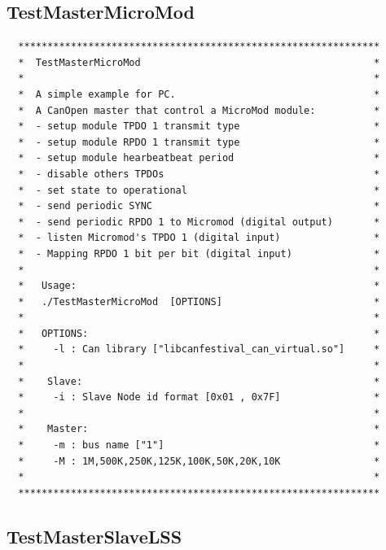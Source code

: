 \documentclass[12pt,english,a4paper]{book}
\begin{document}
\bigskip{}



\subsection{TestMasterMicroMod }



\begin{verbatim}
  **************************************************************
  *  TestMasterMicroMod                                        *
  *                                                            *
  *  A simple example for PC.                                  *
  *  A CanOpen master that control a MicroMod module:          *
  *  - setup module TPDO 1 transmit type                       *
  *  - setup module RPDO 1 transmit type                       *
  *  - setup module hearbeatbeat period                        *
  *  - disable others TPDOs                                    *
  *  - set state to operational                                *
  *  - send periodic SYNC                                      *
  *  - send periodic RPDO 1 to Micromod (digital output)       *
  *  - listen Micromod's TPDO 1 (digital input)                *
  *  - Mapping RPDO 1 bit per bit (digital input)              *
  *                                                            *
  *   Usage:                                                   *
  *   ./TestMasterMicroMod  [OPTIONS]                          *
  *                                                            *
  *   OPTIONS:                                                 *
  *     -l : Can library ["libcanfestival_can_virtual.so"]     *
  *                                                            *
  *    Slave:                                                  *
  *     -i : Slave Node id format [0x01 , 0x7F]                *
  *                                                            *
  *    Master:                                                 *
  *     -m : bus name ["1"]                                    *
  *     -M : 1M,500K,250K,125K,100K,50K,20K,10K                *
  *                                                            *
  **************************************************************
\end{verbatim}

\subsection{TestMasterSlaveLSS}
\end{document}
